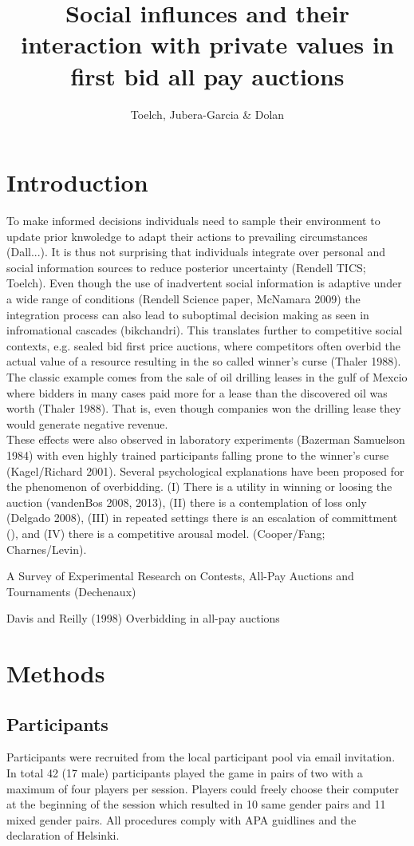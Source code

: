 \documentclass [man]{apa6}
\title{Social influnces and their interaction with private values in first bid all pay auctions  }
\date{}
\author{Toelch, Jubera-Garcia \& Dolan}
\begin{document}
\maketitle

\section{Introduction}
To make informed decisions individuals need to sample their environment to update prior knwoledge to adapt their actions to prevailing circumstances (Dall...). It is thus not surprising that individuals integrate over personal and social information sources to reduce posterior uncertainty (Rendell TICS; Toelch). Even though the use of inadvertent social information is adaptive under a wide range of conditions (Rendell Science paper, McNamara 2009) the integration process can also lead to suboptimal decision making as seen in infromational cascades (bikchandri).  This translates further to competitive social contexts, e.g. sealed bid first price auctions, where competitors often overbid the actual value of a resource resulting in the so called winner's curse (Thaler 1988). The classic example comes from the sale of oil drilling leases in the gulf of Mexcio where bidders in many cases paid more for a lease than the discovered oil was worth (Thaler 1988). That is, even though companies won the drilling lease they would generate negative revenue.\\
These effects were also observed in laboratory experiments (Bazerman Samuelson 1984) with even highly trained participants falling prone to the winner's curse (Kagel/Richard 2001). Several psychological explanations have been proposed  for the phenomenon of overbidding. (I) There is a utility in winning or loosing the auction (vandenBos 2008, 2013), (II) there is a contemplation of loss only (Delgado 2008), (III) in repeated settings there is an escalation of committment (), and (IV) there is a competitive arousal model.     (Cooper/Fang; Charnes/Levin).  

A Survey of Experimental Research on Contests, All-Pay Auctions and Tournaments (Dechenaux)

Davis and Reilly (1998) Overbidding in all-pay auctions



\section {Methods}
\subsection{Participants}
Participants were recruited from the local participant pool via email invitation. In total 42 (17 male) participants played the game in pairs of two with a maximum of four players per session. Players could freely choose their computer at the beginning of the session which resulted in 10 same gender pairs and 11 mixed gender pairs. All procedures comply with APA guidlines and the declaration of Helsinki. 
\end{document}
